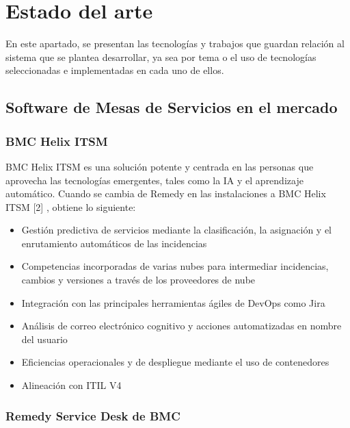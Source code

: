 

\chapter{Estado del arte}
En este apartado, se presentan las tecnologías y trabajos que guardan relación al sistema que se plantea desarrollar, ya sea por tema o el uso de tecnologías seleccionadas e implementadas en cada uno de ellos.

\section{Software de Mesas de Servicios en el mercado}

\subsection{BMC Helix ITSM}

BMC Helix ITSM es una solución potente y centrada en las personas que aprovecha las tecnologías emergentes, tales como la IA y el aprendizaje automático. Cuando se cambia de Remedy en las instalaciones a BMC Helix ITSM [2] , obtiene lo siguiente:

\begin{itemize}
	 
	\item Gestión predictiva de servicios mediante la clasificación, la asignación y el enrutamiento automáticos de las incidencias
    \item Competencias incorporadas de varias nubes para intermediar incidencias, cambios y versiones a través de los proveedores de nube
	\item Integración con las principales herramientas ágiles de DevOps como Jira
	\item Análisis de correo electrónico cognitivo y acciones automatizadas en nombre del usuario
	\item Eficiencias operacionales y de despliegue mediante el uso de contenedores
   \item Alineación con ITIL V4 
	
\end{itemize}

\subsection{Remedy Service Desk de BMC}

